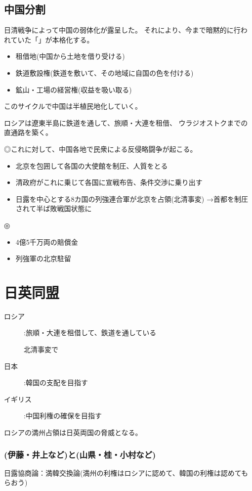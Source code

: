 \documentclass[12pt,fleqn]{ltjsarticle}
\begin{document}
\subsection{中国分割}
日清戦争によって中国の弱体化が露呈した。
それにより、今まで暗黙的に行われていた「」が本格化する。
\begin{itemize}
    \item 租借地(中国から土地を借り受ける)
    \item 鉄道敷設権(鉄道を敷いて、その地域に自国の色を付ける)
    \item 鉱山・工場の経営権(収益を吸い取る)
\end{itemize}
このサイクルで中国は半植民地化していく。

ロシアは遼東半島に鉄道を通して、旅順・大連を租借、
ウラジオストクまでの直通路を築く。

◎これに対して、中国各地で民衆による反侵略闘争が起こる。

\begin{itemize}
    \item 北京を包囲して各国の大使館を制圧、人質をとる
    \item 清政府がこれに乗じて各国に宣戦布告、条件交渉に乗り出す
    \item 日露を中心とする8カ国の列強連合軍が北京を占領(北清事変)
        →首都を制圧されて半ば敗戦国状態に
\end{itemize}

◎
\begin{itemize}
    \item 4億5千万両の賠償金
    \item 列強軍の北京駐留
\end{itemize}

\clearpage
\section{日英同盟}
\begin{description}
    \item[ロシア]:旅順・大連を租借して、鉄道を通している

        北清事変で
    \item[日本]:韓国の支配を目指す
    \item[イギリス]:中国利権の確保を目指す
\end{description}
ロシアの満州占領は日英両国の脅威となる。

\subsubsection*{(伊藤・井上など)と(山県・桂・小村など)}
日露協商論：満韓交換論(満州の利権はロシアに認めて、韓国の利権は認めてもらおう)
\end{document}
